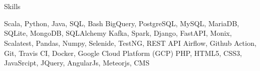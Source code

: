\section{\faTasks}{Skills}

\begin{cvblock}
     {Scala, Python, Java, SQL, Bash}
     {BigQuery, PostgreSQL, MySQL, MariaDB, SQLite, MongoDB, SQLAlchemy}
     {Kafka, Spark, Django, FastAPI, Monix, Scalatest, Pandas, Numpy, Selenide, TestNG, REST API}
     {Airflow, Github Action, Git, Travis CI, Docker, Google Cloud Platform (GCP)}
     {PHP, HTML5, CSS3, JavaSrcipt, JQuery, AngularJs, Meteorjs, CMS}
\end{cvblock}
